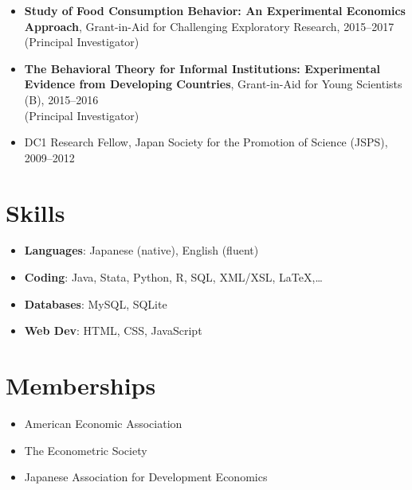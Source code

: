 \documentclass[12pt]{article}
\begin{document}
\begin{itemize}
    \item \textbf{Study of Food Consumption Behavior: An Experimental Economics Approach}, 
    Grant-in-Aid for Challenging Exploratory Research, 2015--2017 \\ (Principal Investigator)

    \item \textbf{The Behavioral Theory for Informal Institutions: Experimental Evidence from Developing Countries}, 
    Grant-in-Aid for Young Scientists (B), 2015--2016 \\ (Principal Investigator)

    \item DC1 Research Fellow, Japan Society for the Promotion of Science (JSPS), 2009--2012
\end{itemize}


\section*{Skills}

\begin{itemize}
  \item \textbf{Languages}: Japanese (native), English (fluent)
  \item \textbf{Coding}: Java, Stata, Python, R, SQL, XML/XSL, \LaTeX,\dots
  \item \textbf{Databases}: MySQL, SQLite
  \item \textbf{Web Dev}: HTML, CSS, JavaScript
\end{itemize}

\section*{Memberships}
\begin{itemize}
    \item American Economic Association
    \item The Econometric Society
    \item Japanese Association for Development Economics
\end{itemize}
\end{document}

